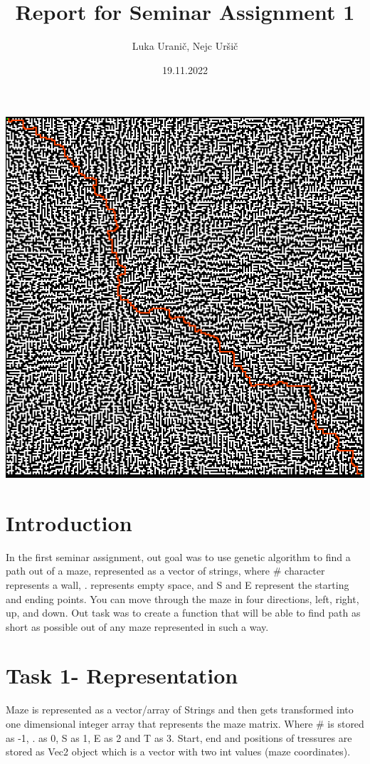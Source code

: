 \documentclass[12pt]{article} %
\title{Report for Seminar Assignment 1}
\author{Luka Uranič, Nejc Uršič}
\date{19.11.2022} %
\begin{document}
\maketitle
\begin{center}
\includegraphics[scale=.75]{bigMaze}
\end{center}

\section{Introduction}
In the first seminar assignment, out goal was to use genetic algorithm to find a path out of a maze,
represented as a vector of strings, where \# character represents a wall, . represents empty space, and
S and E represent the starting and ending points.
You can move through the maze in four directions, left, right, up, and down. Out task was to create a function that will be able to find path
 as short as possible out of any maze represented in such a way.

\section{Task 1-  Representation}
Maze is represented as a vector/array of Strings and then gets transformed into one dimensional integer array that represents the maze matrix. Where
\# is stored as -1, . as 0, S as 1, E as 2 and T as 3. Start, end and positions of tressures are stored as Vec2 object which is a vector with two int values (maze coordinates).
\end{document}
